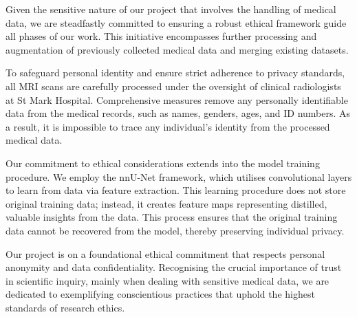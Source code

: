 Given the sensitive nature of our project that involves the handling of medical data, we are steadfastly committed to ensuring a robust ethical framework guide all phases of our work. This initiative encompasses further processing and augmentation of previously collected medical data and merging existing datasets.

To safeguard personal identity and ensure strict adherence to privacy standards, all MRI scans are carefully processed under the oversight of clinical radiologists at St Mark Hospital. Comprehensive measures remove any personally identifiable data from the medical records, such as names, genders, ages, and ID numbers. As a result, it is impossible to trace any individual's identity from the processed medical data.

Our commitment to ethical considerations extends into the model training procedure. We employ the nnU-Net framework, which utilises convolutional layers to learn from data via feature extraction. This learning procedure does not store original training data; instead, it creates feature maps representing distilled, valuable insights from the data. This process ensures that the original training data cannot be recovered from the model, thereby preserving individual privacy.

Our project is on a foundational ethical commitment that respects personal anonymity and data confidentiality. Recognising the crucial importance of trust in scientific inquiry, mainly when dealing with sensitive medical data, we are dedicated to exemplifying conscientious practices that uphold the highest standards of research ethics.